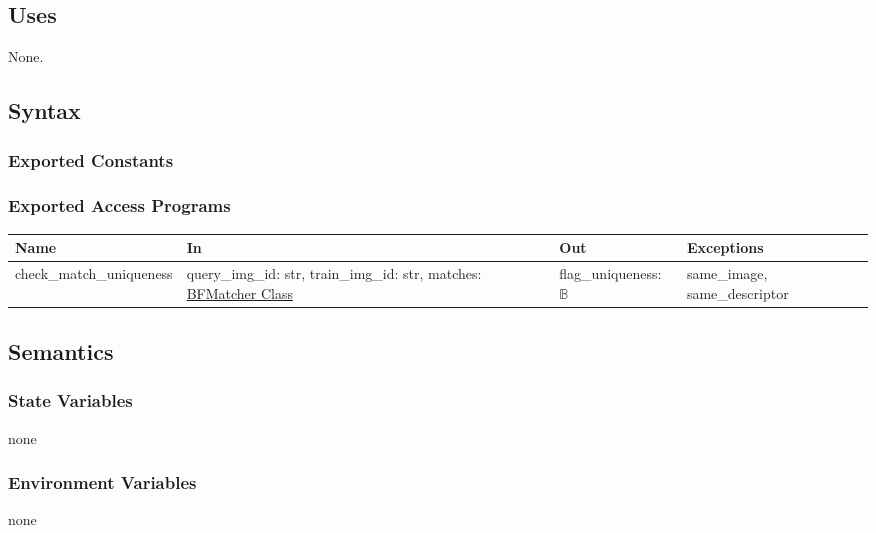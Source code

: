 \documentclass[12pt, titlepage]{article}
\begin{document}
\subsection{Uses}
None.

\subsection{Syntax}

\subsubsection{Exported Constants}

\subsubsection{Exported Access Programs}

\begin{center}
\begin{tabular}{p{4.5cm} p{4cm} p{4cm} p{3cm}}
\hline
\textbf{Name} & \textbf{In} & \textbf{Out} & \textbf{Exceptions} \\
\hline
check\_match\_uniqueness 
& query\_img\_id: str, \newline
train\_img\_id: str, \newline
matches: \href{https://docs.opencv.org/3.4/d3/da1/classcv_1_1BFMatcher.html}{BFMatcher Class}
& flag\_uniqueness: $\mathbb{B}$
& same\_image, \newline
same\_descriptor \\
\hline
\end{tabular}
\end{center}

\subsection{Semantics}

\subsubsection{State Variables}
none

\subsubsection{Environment Variables}
none
\end{document}
